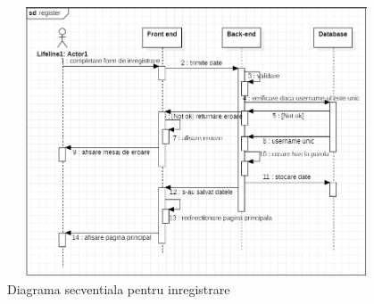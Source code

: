 		\begin{figure}[htbp]
			\centerline{\includegraphics[width=13cm, height=8cm]{figures/sec register.png}}
			\caption{Diagrama secventiala pentru inregistrare}
			\label{fig}
		\end{figure}

